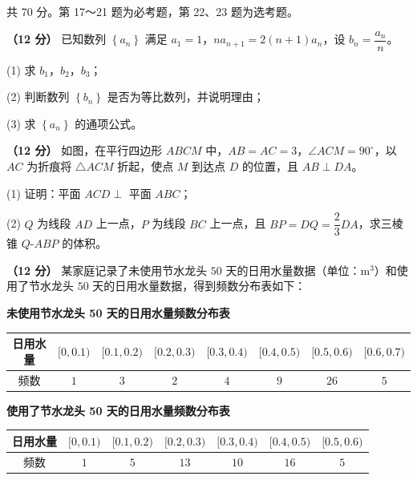 \begin{gktip}
共 70 分。第 17～21 题为必考题，第 22、23 题为选考题。
\end{gktip}


\textbf{（12 分）} 已知数列 $\left\{a_n\right\}$ 满足 $a_1=1$，$na_{n+1}=2(n+1)a_n$，设 $b_n=\dfrac{a_n}n$。

  (1) 求 $b_1$，$b_2$，$b_3$；

  (2) 判断数列 $\left\{b_n\right\}$ 是否为等比数列，并说明理由；

  (3) 求 $\left\{a_n\right\}$ 的通项公式。

\textbf{（12 分）} 如图，在平行四边形 $ABCM$ 中，$AB=AC=3$，$\angle ACM=90^\circ$，以 $AC$ 为折痕将 $\triangle ACM$ 折起，使点 $M$ 到达点 $D$ 的位置，且 $AB\perp DA$。

\begin{center}\end{center}

  (1) 证明：平面 $ACD\perp$ 平面 $ABC$；

  (2) $Q$ 为线段 $AD$ 上一点，$P$ 为线段 $BC$ 上一点，且 $BP=DQ=\dfrac23DA$，求三棱锥 $Q\text{-}ABP$ 的体积。

\textbf{（12 分）} 某家庭记录了未使用节水龙头 $50$ 天的日用水量数据（单位：$\mathrm m^{3}$）和使用了节水龙头 $50$ 天的日用水量数据，得到频数分布表如下：

\textbf{未使用节水龙头 50 天的日用水量频数分布表}

\begin{center}
\begin{tabular}{cccccccc}
\toprule
日用水量 & $[0,0.1)$ & $[0.1,0.2)$ & $[0.2,0.3)$ & $[0.3,0.4)$ & $[0.4,0.5)$ & $[0.5,0.6)$ & $[0.6,0.7)$ \\
\midrule
频数 & $1$ & $3$ & $2$ & $4$ & $9$ & $26$ & $5$ \\
\bottomrule
\end{tabular}
\end{center}

\textbf{使用了节水龙头 50 天的日用水量频数分布表}

\begin{center}
\begin{tabular}{ccccccc}
\toprule
日用水量 & $[0,0.1)$ & $[0.1,0.2)$ & $[0.2,0.3)$ & $[0.3,0.4)$ & $[0.4,0.5)$ & $[0.5,0.6)$ \\
\midrule
频数 & $1$ & $5$ & $13$ & $10$ & $16$ & $5$ \\
\bottomrule
\end{tabular}
\end{center}

